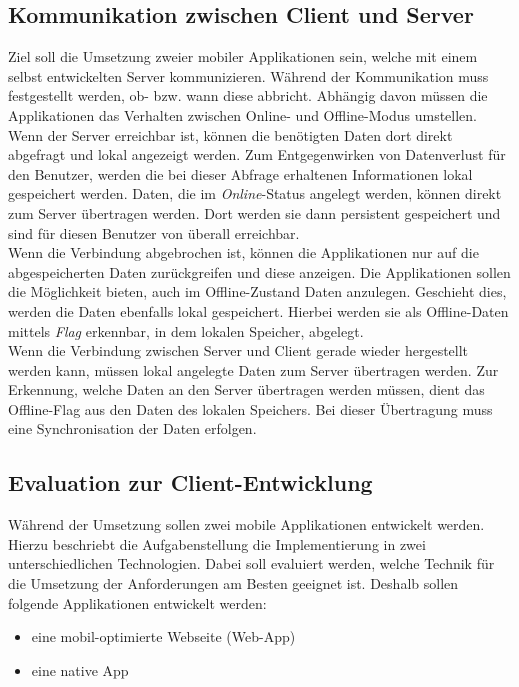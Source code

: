 \subsection{Kommunikation zwischen Client und Server}
\label{ssec:kommunikation-client-server}
Ziel soll die Umsetzung zweier mobiler Applikationen sein, welche mit einem selbst entwickelten Server kommunizieren. Während der Kommunikation muss festgestellt werden, ob- bzw. wann diese abbricht. Abhängig davon müssen die Applikationen das Verhalten zwischen Online- und Offline-Modus umstellen. \\
Wenn der Server erreichbar ist, können die benötigten Daten dort direkt abgefragt und lokal angezeigt werden. Zum Entgegenwirken von Datenverlust für den Benutzer, werden die bei dieser Abfrage erhaltenen Informationen lokal gespeichert werden. Daten, die im \textit{Online}-Status angelegt werden, können direkt zum Server übertragen werden. Dort werden sie dann persistent gespeichert und sind für diesen Benutzer von überall erreichbar.\\
Wenn die Verbindung abgebrochen ist, können die Applikationen nur auf die abgespeicherten Daten zurückgreifen und diese anzeigen. Die Applikationen sollen die Möglichkeit bieten, auch im Offline-Zustand Daten anzulegen. Geschieht dies, werden die Daten ebenfalls lokal gespeichert. Hierbei werden sie als Offline-Daten mittels \textit{Flag} erkennbar, in dem lokalen Speicher, abgelegt.\\
Wenn die Verbindung zwischen Server und Client gerade wieder hergestellt werden kann, müssen lokal angelegte Daten zum Server übertragen werden. Zur Erkennung, welche Daten an den Server übertragen werden müssen, dient das Offline-Flag aus den Daten des lokalen Speichers. Bei dieser Übertragung muss eine Synchronisation der Daten erfolgen. 
\subsection{Evaluation zur Client-Entwicklung}
\label{ssec:evaluation-client-entwicklung}
Während der Umsetzung sollen zwei mobile Applikationen entwickelt werden.  Hierzu beschriebt die Aufgabenstellung die Implementierung in zwei unterschiedlichen Technologien. Dabei soll evaluiert werden, welche Technik für die Umsetzung der Anforderungen am Besten geeignet ist. Deshalb sollen folgende Applikationen entwickelt werden: 
\begin{itemize}
\item eine mobil-optimierte Webseite (Web-App)
\item eine native App 
\end{itemize}
